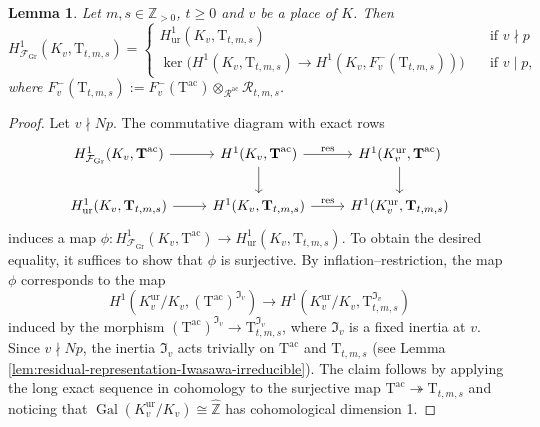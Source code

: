 \documentclass[12pt,reqno]{amsart}
\newtheorem{lemma}[theorem]{Lemma}
\theoremstyle{definition}
\theoremstyle{remark}
\newcommand{\numberset}{\mathbb}
\newcommand{\Z}{\numberset{Z}}
\newcommand{\T}{\boldsymbol{\mathrm{T}}}
\newcommand{\calR}{\mathcal{R}}
\DeclareMathOperator{\Res}{res}
\DeclareMathOperator{\Gal}{Gal}
\newcommand{\ac}{\mathrm{ac}}
\newcommand{\Gr}{\mathrm{Gr}}
\newcommand{\ur}{\mathrm{ur}}
\begin{document}
\begin{lemma}\label{lem:easier-description-Greenberg-condition}
    Let $m,s\in\Z_{>0}$, $t\ge 0$ and $v$ be a place of $K$. Then
    \begin{equation*}
         H^1_{\mathcal{F}_{\Gr}}(K_v,\T_{t,m,s})=\begin{cases}
                H_{\ur}^1(K_v,\T_{t,m,s})\quad &\text{if $v\nmid p$}\\
                \ker\big(H^1(K_v,\T_{t,m,s})\to H^1(K_v,F_v^-(\T_{t,m,s}))\big)\quad &\text{if $v\mid p$},
            \end{cases}
    \end{equation*}
    where $F_v^-(\T_{t,m,s}):=F_v^-(\T^{\ac})\otimes_\mathcal{R^{\ac}}\calR_{t,m,s}$.
\end{lemma}
\begin{proof}
    Let $v\nmid Np$. The commutative diagram with exact rows
        \begin{equation*}
            \begin{tikzcd}
	{H^1_{\mathcal{F}_{\Gr}}(K_v,\T^{\ac})} & {H^1(K_v,\T^{\ac})} & {H^1(K_v^{\ur},\T^{\ac})} \\
	{H^1_{\ur}(K_v,\T_{t,m,s})} & {H^1(K_v,\T_{t,m,s})} & {H^1(K_v^{\ur},\T_{t,m,s})}
	\arrow[from=1-1, to=1-2]
	\arrow["\Res", from=1-2, to=1-3]
	\arrow["\Res", from=2-2, to=2-3]
	\arrow[from=2-1, to=2-2]
	\arrow[from=1-2, to=2-2]
	\arrow[from=1-3, to=2-3]
            \end{tikzcd}
        \end{equation*}
        induces a map $\phi\colon H^1_{\mathcal{F}_{\Gr}}(K_v,\T^{\ac})\longrightarrow H^1_{\ur}(K_v,\T_{t,m,s})$.
        To obtain the desired equality, it suffices to show that $\phi$ is surjective. By inflation--restriction, the map $\phi$ corresponds to the map
        \begin{equation*}
            H^1(K_v^{\ur}/K_v,(\T^{\ac})^{\mathfrak{I}_v})\longrightarrow H^1(K_v^{\ur}/K_v,\T_{t,m,s}^{\mathfrak{I}_v})
        \end{equation*}
        induced by the morphism $(\T^{\ac})^{\mathfrak{I}_v}\to \T_{t,m,s}^{\mathfrak{I}_v}$, where $\mathfrak{I}_v$ is a fixed inertia at $v$. Since $v\nmid Np$, the inertia $\mathfrak{I}_v$ acts trivially on $\T^{\ac}$ and $\T_{t,m,s}$ (see Lemma \ref{lem:residual-representation-Iwasawa-irreducible}). The claim follows by applying the long exact sequence in cohomology to the surjective map $\T^{\ac}\twoheadrightarrow \T_{t,m,s}$ and noticing that $\Gal(K_v^{\ur}/K_v)\cong\hat{\Z}$ has cohomological dimension 1. 


\end{proof}
\end{document}

